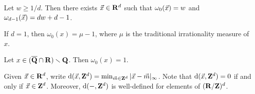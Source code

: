 \begin{theorem}[Jarn\'ik]\label{thm:jarnik}
Let $w\geqslant 1/d$. Then there exists $\vec{x}\in \mathbf{R}^d$ such that 
$\omega_0(\vec{x})=w$ and $\omega_{d-1}(\vec{x}) = d w+d-1$. 
\end{theorem}

\begin{theorem}
If $d=1$, then $\omega_0(x) = \mu-1$, where $\mu$ is the traditional 
irrationality measure of $x$. 
\end{theorem}

\begin{theorem}[Roth]
Let $x\in (\overline{\mathbf{Q}}\cap \mathbf{R})\smallsetminus \mathbf{Q}$. Then 
$\omega_0(x) = 1$. 
\end{theorem}

Given $\vec{x}\in \mathbf{R}^d$, write 
$\mathrm{d}(\vec{x},\mathbf{Z}^d)=\min_{\vec{m}\in \mathbf{Z}^d} |\vec{x}-\vec{m}|_\infty$. Note that 
$\mathrm{d}(\vec{x},\mathbf{Z}^d)=0$ if and only if $\vec{x}\in \mathbf{Z}^d$. Moreover, $\mathrm{d}(-,\mathbf{Z}^d)$ 
is well-defined for elements of $(\mathbf{R}/\mathbf{Z})^d$. 

